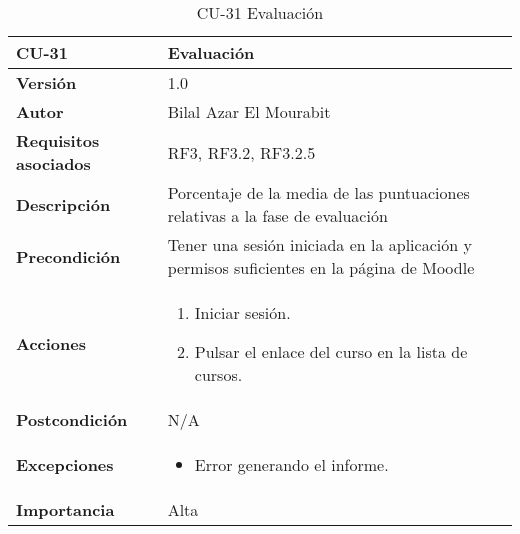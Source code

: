 \begin{table}[H]
	\centering
	\begin{tabularx}{\linewidth}{ p{} p{} }
		\toprule
		\textbf{CU-31}    & \textbf{Evaluación}\\
		\toprule
		\textbf{Versión}              & 1.0    \\
		\textbf{Autor}                & Bilal Azar El Mourabit \\
		\textbf{Requisitos asociados} & RF3, RF3.2, RF3.2.5\\
		\textbf{Descripción}          & Porcentaje de la media de las puntuaciones relativas a la fase de evaluación\\
    		\textbf{Precondición}         & Tener una sesión iniciada en la aplicación y permisos suficientes en la página de Moodle\\
		\textbf{Acciones}             & 
		\begin{enumerate}
			\def\labelenumi{\arabic{enumi}.}
			\tightlist
			\item Iniciar sesión.
            \item Pulsar el enlace del curso en la lista de cursos. 
		\end{enumerate}\\
		\textbf{Postcondición}        & N/A \\
		\textbf{Excepciones}          & \begin{itemize}
		    \item Error generando el informe.
		\end{itemize} \\
		\textbf{Importancia}          & Alta \\
		\bottomrule
	\end{tabularx}
	\caption{CU-31 Evaluación}
\end{table}

